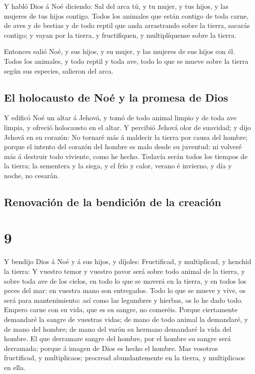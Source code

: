  Y habló Dios á Noé diciendo:  Sal del
arca tú, y tu mujer, y tus hijos, y las mujeres de tus hijos contigo.
 Todos los animales que están contigo de toda carne, de
aves y de bestias y de todo reptil que anda arrastrando sobre la tierra,
sacarás contigo; y vayan por la tierra, y fructifiquen, y multiplíquense
sobre la tierra.

 Entonces salió Noé, y sus hijos, y su mujer, y las
mujeres de sus hijos con él.  Todos los animales, y todo
reptil y toda ave, todo lo que se mueve sobre la tierra según sus
especies, salieron del arca.

\hypertarget{el-holocausto-de-nouxe9-y-la-promesa-de-dios}{%
\subsection{El holocausto de Noé y la promesa de
Dios}\label{el-holocausto-de-nouxe9-y-la-promesa-de-dios}}

 Y edificó Noé un altar á Jehová, y tomó de todo animal
limpio y de toda ave limpia, y ofreció holocausto en el altar.
 Y percibió Jehová olor de suavidad; y dijo Jehová en su
corazón: No tornaré más á maldecir la tierra por causa del hombre;
porque el intento del corazón del hombre es malo desde su juventud: ni
volveré más á destruir todo viviente, como he hecho. 
Todavía serán todos los tiempos de la tierra; la sementera y la siega, y
el frío y calor, verano é invierno, y día y noche, no cesarán.

\hypertarget{renovaciuxf3n-de-la-bendiciuxf3n-de-la-creaciuxf3n}{%
\subsection{Renovación de la bendición de la
creación}\label{renovaciuxf3n-de-la-bendiciuxf3n-de-la-creaciuxf3n}}

\hypertarget{section-8}{%
\section{9}\label{section-8}}

 Y bendijo Dios á Noé y á sus hijos, y díjoles:
Fructificad, y multiplicad, y henchid la tierra:  Y
vuestro temor y vuestro pavor será sobre todo animal de la tierra, y
sobre toda ave de los cielos, en todo lo que se moverá en la tierra, y
en todos los peces del mar: en vuestra mano son entregados.
 Todo lo que se mueve y vive, os será para mantenimiento:
así como las legumbres y hierbas, os lo he dado todo. 
Empero carne con su vida, que es su sangre, no comeréis. 
Porque ciertamente demandaré la sangre de vuestras vidas; de mano de
todo animal la demandaré, y de mano del hombre; de mano del varón su
hermano demandaré la vida del hombre.  El que derramare
sangre del hombre, por el hombre su sangre será derramada; porque á
imagen de Dios es hecho el hombre.  Mas vosotros
fructificad, y multiplicaos; procread abundantemente en la tierra, y
multiplicaos en ella.

